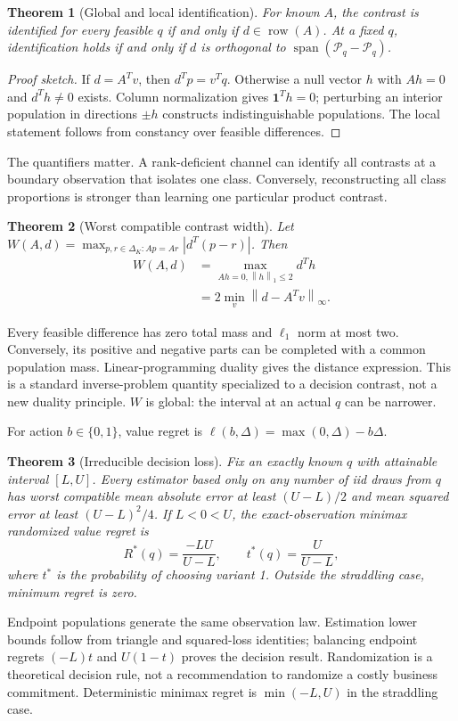 \documentclass[10pt,twocolumn]{article}
\newtheorem{theorem}{Theorem}
\theoremstyle{definition}\newtheorem{definition}[theorem]{Definition}
\newcommand{\simplex}{\Delta_K}
\newcommand{\row}{\operatorname{row}}
\newcommand{\1}{\mathbf 1}
\newcommand{\norm}[1]{\left\lVert#1\right\rVert}
\begin{document}
\begin{theorem}[Global and local identification]\label{thm:main-id}
For known $A$, the contrast is identified for every feasible $q$ if and only if $d\in\row(A)$. At a fixed $q$, identification holds if and only if $d$ is orthogonal to $\operatorname{span}(\mathcal P_q-\mathcal P_q)$.
\end{theorem}
\begin{proof}[Proof sketch]
If $d=A^Tv$, then $d^Tp=v^Tq$. Otherwise a null vector $h$ with $Ah=0$ and $d^Th\ne0$ exists. Column normalization gives $\1^Th=0$; perturbing an interior population in directions $\pm h$ constructs indistinguishable populations. The local statement follows from constancy over feasible differences.
\end{proof}
The quantifiers matter. A rank-deficient channel can identify all contrasts at a boundary observation that isolates one class. Conversely, reconstructing all class proportions is stronger than learning one particular product contrast.

\begin{theorem}[Worst compatible contrast width]\label{thm:main-width}
Let $W(A,d)=\max_{p,r\in\simplex:Ap=Ar}|d^T(p-r)|$. Then
\begin{align}
 W(A,d)&=\max_{Ah=0,\norm{h}_1\leq2}d^Th\\
 &=2\min_v\norm{d-A^Tv}_\infty.
\end{align}
\end{theorem}
Every feasible difference has zero total mass and $\ell_1$ norm at most two. Conversely, its positive and negative parts can be completed with a common population mass. Linear-programming duality gives the distance expression. This is a standard inverse-problem quantity specialized to a decision contrast, not a new duality principle. $W$ is global: the interval at an actual $q$ can be narrower.

For action $b\in\{0,1\}$, value regret is $\ell(b,\Delta)=\max(0,\Delta)-b\Delta$.
\begin{theorem}[Irreducible decision loss]\label{thm:main-risk}
Fix an exactly known $q$ with attainable interval $[L,U]$. Every estimator based only on any number of iid draws from $q$ has worst compatible mean absolute error at least $(U-L)/2$ and mean squared error at least $(U-L)^2/4$. If $L<0<U$, the exact-observation minimax randomized value regret is
\begin{equation}
 R^*(q)=\frac{-LU}{U-L},\qquad
 t^*(q)=\frac{U}{U-L},
\end{equation}
where $t^*$ is the probability of choosing variant 1. Outside the straddling case, minimum regret is zero.
\end{theorem}
Endpoint populations generate the same observation law. Estimation lower bounds follow from triangle and squared-loss identities; balancing endpoint regrets $(-L)t$ and $U(1-t)$ proves the decision result. Randomization is a theoretical decision rule, not a recommendation to randomize a costly business commitment. Deterministic minimax regret is $\min(-L,U)$ in the straddling case.
\end{document}
